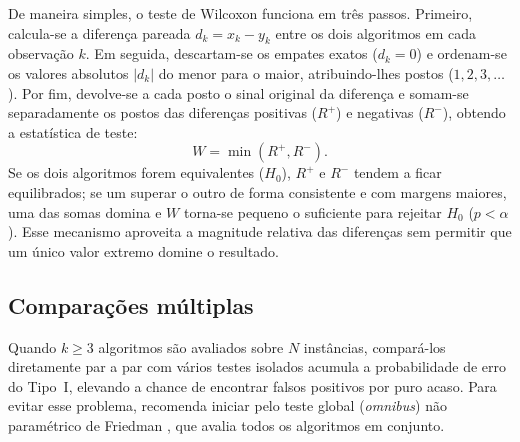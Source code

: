 De maneira simples, o teste de Wilcoxon funciona em três passos.
Primeiro, calcula-se a diferença pareada \(d_k = x_k - y_k\) entre os dois algoritmos em cada observação \(k\).
Em seguida, descartam-se os empates exatos (\(d_k = 0\)) e ordenam-se os valores absolutos \(|d_k|\) do menor para o maior, atribuindo-lhes postos (\(1, 2, 3, \dots\)).
Por fim, devolve-se a cada posto o sinal original da diferença e somam-se separadamente os postos das diferenças positivas (\(R^+\)) e negativas (\(R^-\)), obtendo a estatística de teste:
\begin{equation}\label{eq:wilcoxon}
      W = \min(R^+, R^-)\text{.}
\end{equation}
Se os dois algoritmos forem equivalentes (\(H_0\)), \(R^+\) e \(R^-\) tendem a ficar equilibrados; se um superar o outro de forma consistente e com margens maiores, uma das somas domina e \(W\) torna-se pequeno o suficiente para rejeitar \(H_0\) (\(p < \alpha\)).
Esse mecanismo aproveita a magnitude relativa das diferenças sem permitir que um único valor extremo domine o resultado.

\subsection{Comparações múltiplas}\label{sec-272-comparacoes-multiplas}

Quando \(k \ge 3\) algoritmos são avaliados sobre \(N\) instâncias, compará-los diretamente par a par com vários testes isolados acumula a probabilidade de erro do Tipo~I, elevando a chance de encontrar falsos positivos por puro acaso.
Para evitar esse problema, \textcite[Seção~3.2]{demsar2006statistical} recomenda iniciar pelo teste global (\emph{omnibus}) não paramétrico de Friedman \autocite{friedman1937use}, que avalia todos os algoritmos em conjunto.

